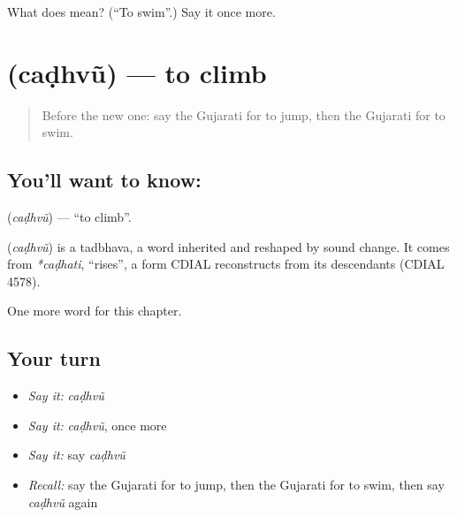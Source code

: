 \begin{tcolorbox}[breakable,colback=teal!4,colframe=teal!35!black,title={Before you move on}]
What does  mean? (\textquotedblleft{}To swim\textquotedblright{}.) Say it once more.
\end{tcolorbox}
\section[\texorpdfstring{\gu{ચઢવું} (caḍhvũ)}{ચઢવું (caḍhvũ)}]{ (caḍhvũ) — to climb}

\label{lesson:GU-C138-cadhvu}



\begin{quote}
Before the new one: say the Gujarati for to jump, then the Gujarati for to swim.
\end{quote}

\subsection*{You'll want to know: }
\textbf{} (\emph{caḍhvũ}) — \textquotedblleft{}to climb\textquotedblright{}.

\begin{cousinweb}
\textbf{} (\emph{caḍhvũ}) is a tadbhava, a word inherited and reshaped by sound change. It comes from \emph{*caḍhati}, \textquotedblleft{}rises\textquotedblright{}, a form CDIAL reconstructs from its descendants (CDIAL 4578).
\end{cousinweb}

\begin{grammarlens}[title={What you've built}]
One more word for this chapter.
\end{grammarlens}

\subsection*{Your turn}
\begin{itemize}
\raggedright
  \item \emph{Say it:} \emph{caḍhvũ}
  \item \emph{Say it:} \emph{caḍhvũ}, once more
  \item \emph{Say it:} say \emph{caḍhvũ}
  \item \emph{Recall:} say the Gujarati for to jump, then the Gujarati for to swim, then say \emph{caḍhvũ} again
\end{itemize}

